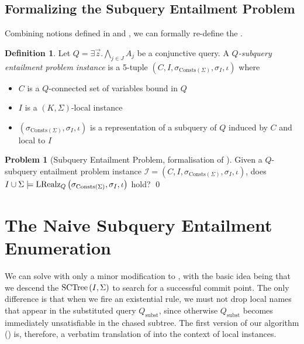 \documentclass[12pt]{report}
\theoremstyle{plain}
\theoremstyle{definition}
\newtheorem{problem}[theorem]{Problem}
\newtheorem{definition}[theorem]{Definition}
\def\Consts{{\mathrm{Consts}}}
\newcommand{\SCTree}[2]{\ensuremath{\normalfont{\textrm{SCTree}} \left( #1, #2 \right)}}
\newcommand{\LRealz}[2]{\ensuremath{\normalfont{\textrm{LRealz}}_{ #1 } \left( #2 \right)}}
\begin{document}
\subsection{Formalizing the Subquery Entailment Problem}

Combining notions defined in  and , we can formally re-define the .

\begin{definition}
  Let $Q = \exists \vec{z}. \bigwedge_{j \in J} A_j$ be a conjunctive query. A \emph{$Q$-subquery entailment problem instance} is a 5-tuple $(C, I, \sigma_{\Consts(\Sigma)}, \sigma_I, \iota)$ where
  \begin{itemize}
    \item $C$ is a $Q$-connected set of variables bound in $Q$
    \item $I$ is a $(K, \Sigma)$-local instance
    \item $(\sigma_{\Consts(\Sigma)}, \sigma_I, \iota)$ is a representation of a subquery of $Q$ induced by $C$ and local to $I$
  \end{itemize}
\end{definition}

\begin{problem}[Subquery Entailment Problem, formalisation of ]
\label{subquery-entailment-problem}
  Given a $Q$-subquery entailment problem instance $\mathcal{I} = (C, I, \sigma_{\Consts(\Sigma)}, \sigma_I, \iota)$, does $I \cup \Sigma \models \LRealz{Q}{\sigma_{\Consts(\Sigma)}, \sigma_I, \iota}$ hold?
  \qed
\end{problem}

\section{The Naive Subquery Entailment Enumeration}
\label{section:naive-subquery-entailment-enumeration}

We can solve  with only a minor modification to , with the basic idea being that we descend the $\SCTree{I}{\Sigma}$ to search for a successful commit point. The only difference is that when we fire an existential rule, we must not drop local names that appear in the substituted query $Q_\mathrm{subst}$, since otherwise $Q_\mathrm{subst}$ becomes immediately unsatisfiable in the chased subtree. The first version of our algorithm () is, therefore, a verbatim translation of  into the context of local instances.
\end{document}
